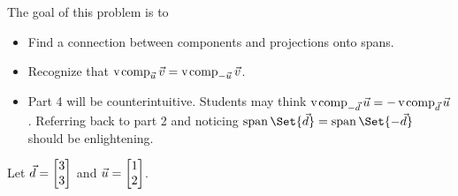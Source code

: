 \documentclass{problemset}
\newcommand{\displayonlynewpage}{\begin{displayonly}\newpage\end{displayonly}}
\newcommand{\bookonlynewpage}{\begin{bookonly}\newpage\end{bookonly}}
\begin{document}
	\bookonlynewpage
	\displayonlynewpage
	\question
	\begin{annotation}
		\begin{goals}

			The goal of this problem is to
			\begin{itemize}
				\item Find a connection between components and projections
					onto spans.
				\item Recognize that $\operatorname{\operatorname{v\hspace{1pt}comp}}_{\vec u}\vec v=\operatorname{\operatorname{v\hspace{1pt}comp}}_{-\vec u}\vec v$.
			\end{itemize}
		\end{goals}

		\begin{notes}
			\begin{itemize}
				\item Part 4 will be counterintuitive. Students may
					think $\operatorname{\operatorname{v\hspace{1pt}comp}}_{-\vec d}\vec u=-\operatorname{\operatorname{v\hspace{1pt}comp}}_{\vec d}\vec u$.
					Referring back to part 2 and noticing $\Span\Set{\vec d}=\Span\Set{-\vec d}$
					should be enlightening.
			\end{itemize}
		\end{notes}
	\end{annotation}
	Let $\vec d=\mat{3\\3}$ and $\vec u=\mat{1\\2}$.
\end{document}
